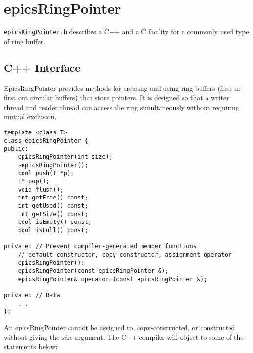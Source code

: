 \section{epicsRingPointer}

\verb|epicsRingPointer.h| describes a C++ and a C facility for a commonly used type of ring buffer.

\subsection{C++ Interface}

EpicsRingPointer provides methods for creating and using ring buffers (first in first out circular buffers) that store 
pointers. It is designed so that a writer thread and reader thread can access the ring simultaneously without requiring 
mutual exclusion.

\begin{verbatim}
template <class T>
class epicsRingPointer {
public:
    epicsRingPointer(int size);
    ~epicsRingPointer();
    bool push(T *p);
    T* pop();
    void flush();
    int getFree() const;
    int getUsed() const;
    int getSize() const;
    bool isEmpty() const;
    bool isFull() const;

private: // Prevent compiler-generated member functions
    // default constructor, copy constructor, assignment operator
    epicsRingPointer();
    epicsRingPointer(const epicsRingPointer &);
    epicsRingPointer& operator=(const epicsRingPointer &);

private: // Data
    ...
};
\end{verbatim}

An epicsRingPointer cannot be assigned to, copy-constructed, or constructed without giving the \emph{size} argument. The C++ 
compiler will object to some of the statements below:

